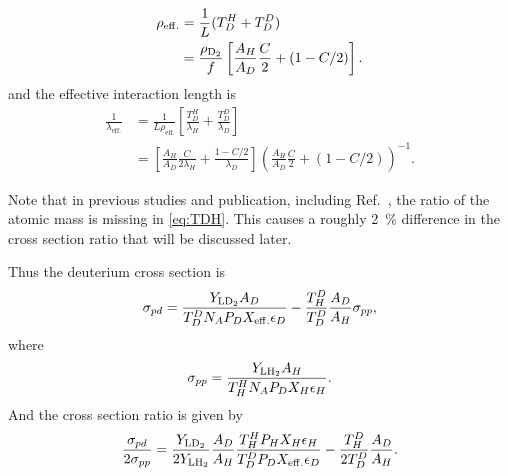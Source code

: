 \documentclass[../main.tex]{subfiles}
\begin{document}
\begin{equation}
	\begin{split}
		\rho_{\mathrm{eff.}} &= \frac{1}{L} (T_D^H + T_D^D)\\
		&=\frac{\rho_{\ce{D_2}}}{f} \left[ \frac{A_H}{A_D}\frac{C}{2}+(1-C/2) \right].
	\end{split}
\end{equation}
and the effective interaction length is
\begin{equation}
	\begin{split}
		\frac{1}{\lambda_{\mathrm{eff.}}} &= \frac{1}{L\rho_{\mathrm{eff.}}} \left[\frac{T_D^H}{\lambda_H} +\frac{T_D^D}{\lambda_D}\right]\\
		&=\left[\frac{A_H}{A_D}\frac{C}{2\lambda_H} + \frac{1-C/2}{\lambda_D}\right]\left( \frac{A_H}{A_D}\frac{C}{2} +(1-C/2)\right)^{-1}.
	\end{split}
\end{equation}

Note that in previous studies and publication, including Ref.~\cite{dove2021}, the ratio of the atomic mass
is missing in \cref{eq:TDH}. This causes a roughly \SI{2}{\percent} difference in the cross section ratio
that will be discussed later.

Thus the deuterium cross section is
\begin{equation}
	\sigma_{pd} = \frac{Y_{\ce{LD_2}} A_D}{T_D^D N_A P_D X_{\mathrm{eff.}} \epsilon_D} - \frac{T^D_H}{T_D^D} \frac{A_D}{A_H} \sigma_{pp},
\end{equation}
where
\begin{equation}
	\sigma_{pp} = \frac{Y_{\ce{LH_2}} A_H}{T_H^H N_A P_D X_{H} \epsilon_H}.
\end{equation}
And the cross section ratio is given by
\begin{equation}
	\frac{\sigma_{pd}}{2\sigma_{pp}} = \frac{Y_{\ce{LD_2}}}{2Y_{\ce{LH_2}}}\frac{A_D}{A_H}\frac{T_H^H P_H X_{H} \epsilon_H}{T_D^D P_D X_{\mathrm{eff.}} \epsilon_D} - \frac{T^D_H}{2T_D^D} \frac{A_D}{A_H}.
\end{equation}
\end{document}
